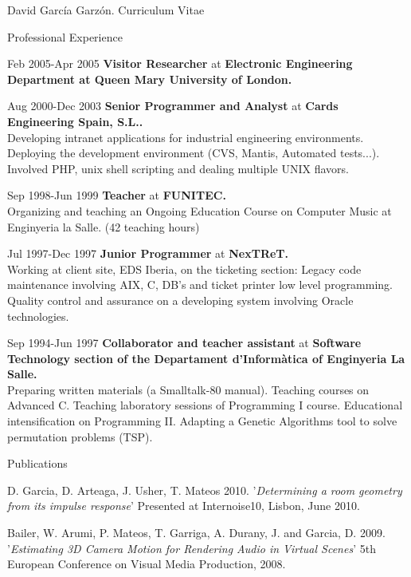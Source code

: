 \documentclass{article}
\begin{document}
\begin{cv}{David García Garzón. Curriculum Vitae}
\begin{cvlist}{Professional Experience}
\item[Feb 2005-Apr 2005]
{\bf Visitor Researcher} at
{\bf Electronic Engineering Department at Queen Mary University of London.}\\


\item[Aug 2000-Dec 2003]
{\bf Senior Programmer and Analyst} at
{\bf Cards Engineering Spain, S.L..}\\
Developing intranet applications for industrial engineering environments. Deploying the development environment (CVS, Mantis, Automated tests...). Involved PHP, unix shell scripting and dealing multiple UNIX flavors.

\item[Sep 1998-Jun 1999]
{\bf Teacher} at
{\bf FUNITEC.}\\
Organizing and teaching an Ongoing Education Course on Computer Music at Enginyeria la Salle. (42 teaching hours)

\item[Jul 1997-Dec 1997]
{\bf Junior Programmer} at
{\bf NexTReT.}\\
Working at client site, EDS Iberia, on the ticketing section: Legacy code maintenance involving AIX, C, DB’s and ticket printer low level programming. Quality control and assurance on a developing system involving Oracle technologies.

\item[Sep 1994-Jun 1997]
{\bf Collaborator and teacher assistant} at
{\bf Software Technology section of the Departament d'Informàtica of Enginyeria La Salle.}\\
Preparing written materials (a Smalltalk-80 manual). Teaching courses on Advanced C. Teaching laboratory sessions of Programming I course. Educational intensification on Programming II. Adapting a Genetic Algorithms tool to solve permutation problems (TSP). 
	
\end{cvlist}

\begin{cvlist}{Publications}

\item[] {\sc D. Garcia, D. Arteaga,  J.  Usher, T. Mateos} 2010.
'{\em Determining a room geometry from its impulse response}'
Presented at Internoise10, Lisbon, June 2010.

\item[] {\sc Bailer, W. Arumi, P. Mateos, T. Garriga, A. Durany, J. and Garcia, D.} 2009.
'{\em Estimating 3D Camera Motion for Rendering Audio in Virtual Scenes}'
5th European Conference on Visual Media Production, 2008.


\end{cvlist}
\end{cv}
\end{document}
